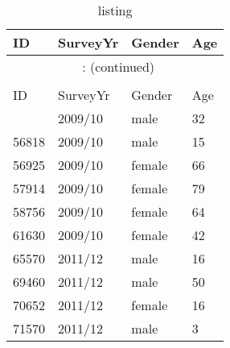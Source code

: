 \documentclass{article}
\begin{document}
\hypertarget{listing}{} 
\begingroup\footnotesize\begin{longtable}{llll}
\caption{listing}\\
\toprule
ID & SurveyYr & Gender & Age\\
\hline
\endfirsthead
\multicolumn{4}{c}{\tablename~\thetable{}: (continued)}\\\\
\toprule
ID & SurveyYr & Gender & Age\\
\hline
\endhead \hline \endfoot \hline
\endlastfoot
55460 & 2009/10 & male & 32 \\
56818 & 2009/10 & male & 15 \\
56925 & 2009/10 & female & 66 \\
57914 & 2009/10 & female & 79 \\
58756 & 2009/10 & female & 64 \\
61630 & 2009/10 & female & 42 \\
65570 & 2011/12 & male & 16 \\
69460 & 2011/12 & male & 50 \\
70652 & 2011/12 & female & 16 \\
71570 & 2011/12 & male &  3 \\
\end{longtable}

\endgroup
\end{document}

